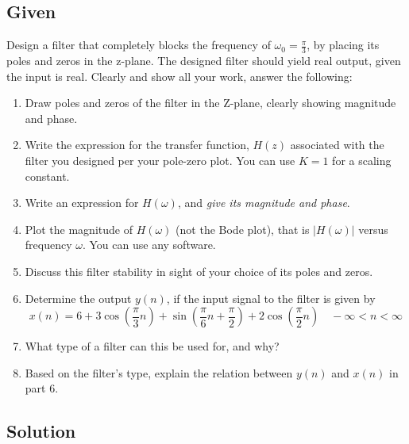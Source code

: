 \documentclass[12pt,letterpaper]{article}
\begin{document}
\subsection*{Given}
Design a filter that completely blocks the frequency of $\omega_0 = \frac{\pi}{3}$, by placing its poles and zeros in the z-plane. The designed filter should yield real output, given the input is real. Clearly and show all your work, answer the following:
\begin{enumerate}
    \item Draw poles and zeros of the filter in the Z-plane, clearly showing magnitude and phase.
    \item Write the expression for the transfer function, $H(z)$ associated with the filter you designed per your pole-zero plot. You can use $K=1$ for a scaling constant.
    \item Write an expression for $H(\omega)$, and \textit{give its magnitude and phase}.
    \item Plot the magnitude of $H(\omega)$ (not the Bode plot), that is $|H(\omega)|$ versus frequency $\omega$. You can use any software.
    \item Discuss this filter stability in sight of your choice of its poles and zeros.
    \item Determine the output $y(n)$, if the input signal to the filter is given by
    \[x(n) = 6 + 3 \cos\left(\frac{\pi}{3}n\right) + \sin\left(\frac{\pi}{6}n + \frac{\pi}{2}\right) + 2 \cos\left(\frac{\pi}{2}n\right) \quad - \infty < n < \infty\]
    \item What type of a filter can this be used for, and why?
    \item Based on the filter’s type, explain the relation between $y(n)$ and $x(n)$ in part 6.
\end{enumerate}
\newpage
\subsection*{Solution}
\end{document}
